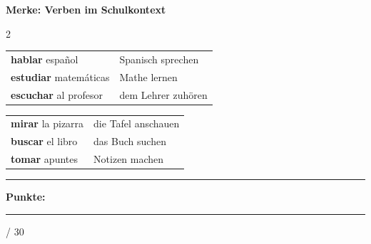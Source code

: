 \documentclass[10pt, a4paper]{article}
\newcommand{\sanstext}[1]{{\fontfamily{phv}\selectfont #1}}
\newcommand{\maxpunkte}{30}
\newcommand{\es}[1]{\textbf{#1}}
\newcommand{\luecke}[1]{\rule{#1}{0.4pt}}
\begin{document}
\vspace{6pt}

\noindent\fbox{\parbox{\dimexpr\textwidth-2\fboxsep-2\fboxrule}{%
\vspace{2.5cm}
}}


\vspace{6pt}

\begin{merkbox}
\sanstext{\textbf{Merke: Verben im Schulkontext}}

\vspace{3pt}

\begin{multicols}{2}

{\small
\begin{tabular}{@{}ll@{}}
\es{hablar} español & Spanisch sprechen \\
\es{estudiar} matemáticas & Mathe lernen \\
\es{escuchar} al profesor & dem Lehrer zuhören \\
\end{tabular}}

\columnbreak

{\small
\begin{tabular}{@{}ll@{}}
\es{mirar} la pizarra & die Tafel anschauen \\
\es{buscar} el libro & das Buch suchen \\
\es{tomar} apuntes & Notizen machen \\
\end{tabular}}

\end{multicols}
\end{merkbox}


\vfill

\noindent\rule{\textwidth}{0.5pt}

\vspace{4pt}

\hfill\sanstext{\textbf{Punkte:}} \luecke{1.2cm} / \maxpunkte
\end{document}
